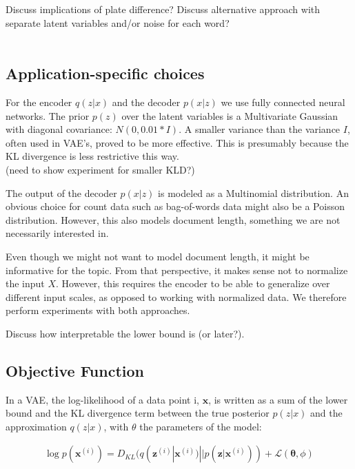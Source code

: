 \documentclass{report}
\begin{document}
Discuss implications of plate difference? Discuss alternative approach with separate latent variables and/or noise for each word?\\ \\

\subsection{Application-specific choices}

For the encoder $q(z|x)$ and the decoder $p(x|z)$ we use fully connected neural networks. The prior $p(z)$ over the latent variables is a Multivariate Gaussian with diagonal covariance: $N(0,0.01*I)$. A smaller variance than the variance $I$, often used in VAE's, proved to be more effective. This is presumably because the KL divergence is less restrictive this way. 
\\
(need to show experiment for smaller KLD?)


The output of the decoder $p(x|z)$ is modeled as a Multinomial distribution. An obvious choice for count data such as bag-of-words data might also be a Poisson distribution. However, this also models document length, something we are not necessarily interested in.  

Even though we might not want to model document length, it might be informative for the topic. From that perspective, it makes sense not to normalize the input $X$. However, this requires the encoder to be able to generalize over different input scales, as opposed to working with normalized data. We therefore perform experiments with both approaches.

Discuss how interpretable the lower bound is (or later?). 

\subsection{Objective Function}

In a VAE, the log-likelihood of a data point i, $\mathbf{x}$, is written as a sum of the lower bound and the KL divergence term between the true posterior $p(z|x)$ and the approximation $q(z|x)$, with $\theta$ the parameters of the model:

\begin{align*}
\log p(\mathbf{x}^{(i)}) = D_{KL}(q(\mathbf{z}^{(i)}|\mathbf{x}^{(i)}) || p(\mathbf{z}|\mathbf{x}^{(i)})) + \mathcal{L}(\mathbf{\theta}, \phi)
\end{align*}
\end{document}
